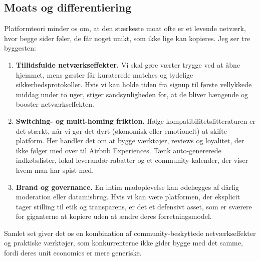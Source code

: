 \subsection*{Moats og differentiering}
Platformteori minder os om, at den stærkeste moat ofte er et levende netværk, hvor begge sider føler, de får noget unikt, som ikke lige kan kopieres.\citep{Choudary2016,Reillier2017} Jeg ser tre byggesten:
\begin{enumerate}
  \item \textbf{Tillidsfulde netværkseffekter.} Vi skal gøre værter trygge ved at åbne hjemmet, mens gæster får kuraterede matches og tydelige sikkerhedsprotokoller. Hvis vi kan holde tiden fra signup til første vellykkede middag under to uger, stiger sandsynligheden for, at de bliver hængende og booster netværkseffekten.
  \item \textbf{Switching- og multi-homing friktion.} Ifølge kompatibilitetslitteraturen er det stærkt, når vi gør det dyrt (økonomisk eller emotionelt) at skifte platform.\citep{FarrellSaloner1986} Her handler det om at bygge værktøjer, reviews og loyalitet, der ikke følger med over til Airbnb Experiences. Tænk auto-genererede indkøbslister, lokal leverandør-rabatter og et community-kalender, der viser hvem man har spist med.\citep{ShapiroVarian1999}
  \item \textbf{Brand og governance.} En intim madoplevelse kan ødelægges af dårlig moderation eller datamisbrug. Hvis vi kan være platformen, der eksplicit tager stilling til etik og transparens, er det et defensivt asset, som er sværere for giganterne at kopiere uden at ændre deres forretningsmodel.\citep{Zuboff2019}
\end{enumerate}
Samlet set giver det os en kombination af community-beskyttede netværkseffekter og praktiske værktøjer, som konkurrenterne ikke gider bygge med det samme, fordi deres unit economics er mere generiske.

